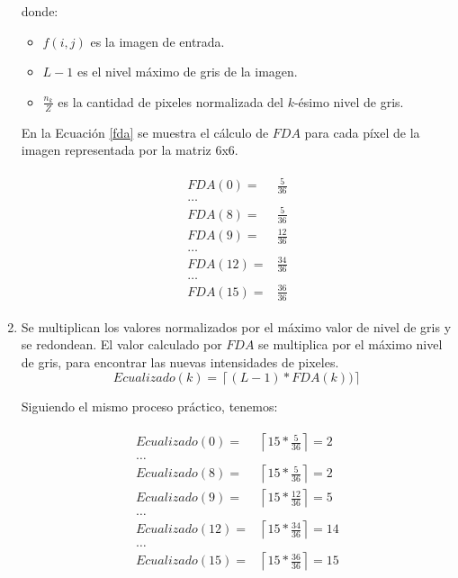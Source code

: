 \begin{enumerate}
    donde:
    \begin{itemize}
        \item $f(i,j)$ es la imagen de entrada.
        \item $L-1$ es el nivel máximo de gris de la imagen.
        \item $\frac{n_k} {Z}$ es la cantidad de pixeles normalizada del $k$-ésimo nivel de gris.
    \end{itemize} \break
    
    En la Ecuación \ref{fda} se muestra el cálculo de $FDA$ para cada píxel de la imagen representada por la matriz 6x6. 
    
    \begin{align}
        \begin{split}
            FDA(0) ={}& \frac{5}{36}\\
            \ldots\\
            FDA(8) ={}& \frac{5}{36}\\
            FDA(9) ={}& \frac{12}{36}\\ 
            \ldots\\
            FDA(12) ={}& \frac{34}{36}\\
            \ldots\\
            FDA(15) ={}& \frac{36}{36}
        \end{split}
        \label{fda_6x6}
    \end{align}
    
    \item Se multiplican los valores normalizados por el máximo valor de nivel de gris y se redondean. El valor calculado por $FDA$ se multiplica por el máximo nivel de gris, para encontrar las nuevas intensidades de pixeles. \\
    \begin{equation} \label{ecualizado}
        Ecualizado(k)= \left \lceil (L-1) * FDA(k)) \right \rceil
    \end{equation}
    
    Siguiendo el mismo proceso práctico, tenemos:
    
     \begin{align}
        \begin{split}
    Ecualizado(0) ={}& \left \lceil 15 * \frac{5}{36} \right \rceil  = 2  \\
    \ldots\\
    Ecualizado(8) ={}& \left \lceil 15 * \frac{5}{36} \right \rceil  =  2  \\
    Ecualizado(9) ={}&  \left \lceil 15 * \frac{12}{36} \right \rceil  = 5  \\
    \ldots\\
    Ecualizado(12) ={}&  \left \lceil 15 * \frac{34}{36} \right \rceil  = 14  \\
    \ldots\\
    Ecualizado(15) ={}& \left \lceil 15 * \frac{36}{36} \right \rceil  = 15 \\
           \end{split}
    \end{align}


\end{enumerate}
